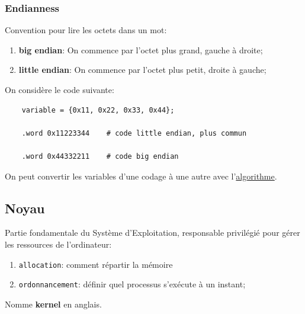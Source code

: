 \documentclass{article}
\begin{document}
\subsubsection{Endianness}
\begin{definition}\label{def:endianness}
    Convention pour lire les octets dans un mot:
    \begin{enumerate}[noitemsep]
        \item \textbf{big endian}: On commence par l'octet plus grand, gauche à droite;
        \item \textbf{little endian}: On commence par l'octet plus petit, droite à gauche;
    \end{enumerate}
    
    \begin{example}
        On considère le code suivante:
        \begin{scriptsize}\myRISCV
            \begin{lstlisting}
    variable = {0x11, 0x22, 0x33, 0x44};
    
    .word 0x11223344    # code little endian, plus commun
    
    .word 0x44332211    # code big endian
            \end{lstlisting}
        \end{scriptsize}
    \end{example}

    On peut convertir les variables d'une codage à une autre avec l'\href{https://codereview.stackexchange.com/questions/151049/endianness-conversion-in-c}{algorithme}.
\end{definition}


\subsection{Noyau}
\begin{definition}\label{def:noyau}
    Partie fondamentale du Système d'Exploitation, responsable privilégié pour gérer les ressources de l'ordinateur:
    \begin{enumerate}[noitemsep]
        \item \texttt{allocation}: comment répartir la mémoire
        \item \texttt{ordonnancement}: définir quel processus s'exécute à un instant;
    \end{enumerate}
    
    \begin{remark}
        Nomme \textbf{kernel} en anglais.
    \end{remark}
\end{definition}
\end{document}
